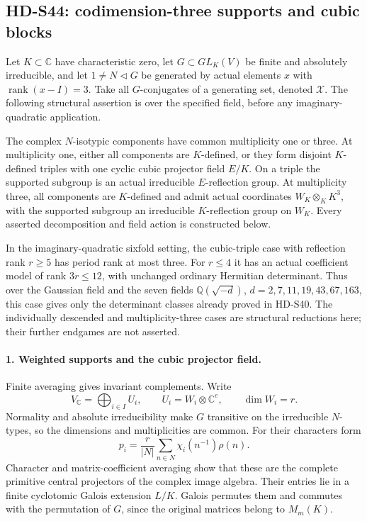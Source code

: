 \subsection{HD-S44: codimension-three supports and cubic blocks}
\label{sec:codimension-three-supports}

Let \(K\subset\mathbb C\) have characteristic zero, let
\(G\subset GL_K(V)\) be finite and absolutely irreducible,
and let \(1\ne N\triangleleft G\) be generated by actual
elements \(x\) with \(\operatorname{rank}(x-I)=3\).
Take all \(G\)-conjugates of a generating set, denoted
\(\mathcal X\). The following structural assertion is over
the specified field, before any imaginary-quadratic application.

The complex \(N\)-isotypic components have common multiplicity
one or three. At multiplicity one, either all components are
\(K\)-defined, or they form disjoint \(K\)-defined triples
with one cyclic cubic projector field \(E/K\). On a triple
the supported subgroup is an actual irreducible \(E\)-reflection
group. At multiplicity three, all components are \(K\)-defined
and admit actual coordinates \(W_K\otimes_K K^3\), with the
supported subgroup an irreducible \(K\)-reflection group on
\(W_K\). Every asserted decomposition and field action is
constructed below.

In the imaginary-quadratic sixfold setting, the cubic-triple
case with reflection rank \(r\ge5\) has period rank at most
three. For \(r\le4\) it has an actual coefficient model of
rank \(3r\le12\), with unchanged ordinary Hermitian determinant.
Thus over the Gaussian field and the seven fields
\(\mathbb Q(\sqrt{-d})\), \(d=2,7,11,19,43,67,163\),
this case gives only the determinant classes already proved
in HD-S40. The individually descended and multiplicity-three
cases are structural reductions here; their further endgames
are not asserted.

\paragraph{1. Weighted supports and the cubic projector field.}
Finite averaging gives invariant complements. Write
\[
 V_{\mathbb C}=\bigoplus_{i\in I}U_i,\qquad
 U_i=W_i\otimes\mathbb C^e,\qquad \dim W_i=r.
 \tag{S44.1}
\]
Normality and absolute irreducibility make \(G\) transitive
on the irreducible \(N\)-types, so the dimensions and
multiplicities are common. For their characters form
\[
 p_i=\frac r{|N|}\sum_{n\in N}\chi_i(n^{-1})\rho(n).
 \tag{S44.2}
\]
Character and matrix-coefficient averaging show that these
are the complete primitive central projectors of the complex
image algebra. Their entries lie in a finite cyclotomic
Galois extension \(L/K\). Galois permutes them and commutes
with the permutation of \(G\), since the original matrices
belong to \(M_m(K)\).

